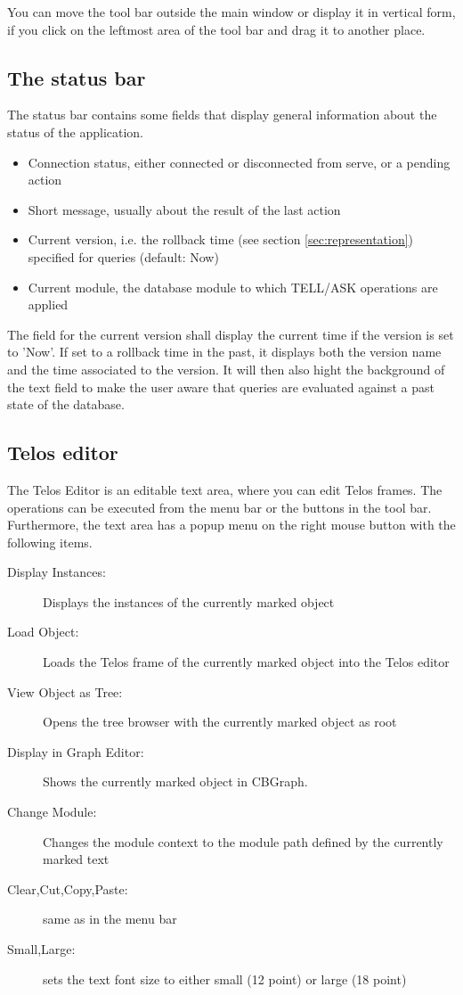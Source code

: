 You can move the tool bar outside the
main window or display it in vertical form, if you click on the leftmost area of the tool bar
and drag it to another place.




\subsection{The status bar}

The status bar contains some fields that display general information about the status of the application.

\begin{itemize}
\item Connection status, either connected or disconnected from serve, or a pending action
\item Short message, usually about the result of the last action
\item Current version, i.e. the rollback time (see section \ref{sec:representation})
     specified for queries (default: Now)
\item Current module, the database module to which TELL/ASK operations are applied
\end{itemize}

The field for the current version shall display the current time if the
version is set to 'Now'. If set to a rollback time in the past, it displays
both the version name and the time associated to the version. It will
then also hight the background of the text field to make the user aware
that queries are evaluated against a past state of the database.



\subsection{Telos editor}
\label{sec:telos_ed}

The Telos Editor is an editable text area, where you can edit Telos frames.
The operations can be executed from the menu bar or the buttons in the tool bar.
Furthermore, the text area has a popup menu on the right mouse button with
the following items.

\begin{description}
\item[Display Instances:] Displays the instances of the currently marked object
\item[Load Object:] Loads the Telos frame of the currently marked object into the Telos editor
\item[View Object as Tree:] Opens the tree browser with the currently marked object as root
\item[Display in Graph Editor:] Shows the currently marked object in CBGraph.
\item[Change Module:] Changes the module context to the module path defined by the currently marked text
\item[Clear,Cut,Copy,Paste:] same as in the menu bar
\item[Small,Large:] sets the text font size to either small (12 point) or large (18 point)
\end{description}

